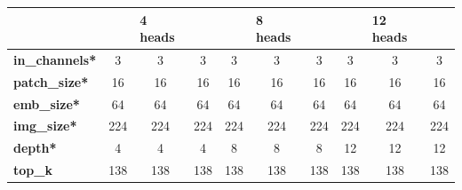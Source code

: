 \begin{table}[!htp]
\centering
\begin{tabular}{|l|ccc|ccc|ccc|}
\multicolumn{1}{l}{\textbf{}} & \multicolumn{1}{l}{\textbf{}} & \multicolumn{1}{l}{\textbf{4 heads}} & \multicolumn{1}{l}{\textbf{}} & \multicolumn{1}{l}{\textbf{}} & \multicolumn{1}{l}{\textbf{8 heads}} & \multicolumn{1}{l}{\textbf{}} & \multicolumn{1}{l}{\textbf{}} & \multicolumn{1}{l}{\textbf{12 heads}} & \multicolumn{1}{l}{\textbf{}} \\ \hline
\textbf{in\_channels*}      & 3                             & 3                                    & 3                             & 3                             & 3                                    & 3                             & 3                             & 3                                     & 3                             \\ \hline
\textbf{patch\_size*}       & 16                            & 16                                   & 16                            & 16                            & 16                                   & 16                            & 16                            & 16                                    & 16                            \\ \hline
\textbf{emb\_size*}         & 64                            & 64                                   & 64                            & 64                            & 64                                   & 64                            & 64                            & 64                                    & 64                            \\ \hline
\textbf{img\_size*}         & 224                           & 224                                  & 224                           & 224                           & 224                                  & 224                           & 224                           & 224                                   & 224                           \\ \hline
\textbf{depth*}             & 4                             & 4                                    & 4                             & 8                             & 8                                    & 8                             & 12                            & 12                                    & 12                            \\ \hline
\textbf{top\_k}            & 138                           & 138                                  & 138                           & 138                           & 138                                  & 138                           & 138                           & 138                                   & 138                           \\ \hline

\end{tabular}
\end{table}
